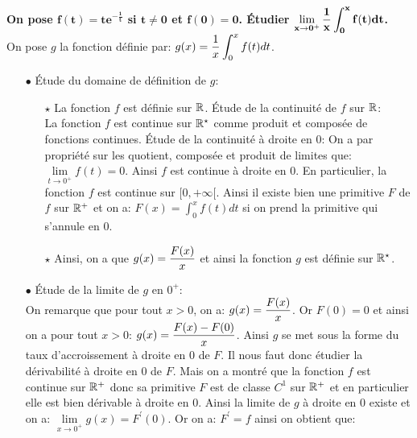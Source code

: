 \documentclass[a4paper, 11pt,reqno]{article}
\begin{document}
\vspace*{-0.5cm}
\begin{correction}\;
	\noindent \textbf{On pose $\mathbf{f(t)=te^{-\frac{1}{t}}}$ si $\mathbf{t\not= 0}$ et $\mathbf{f(0)=0}$. \'Etudier $\mathbf{\lim\limits_{x\to 0^+} \displaystyle\frac{1}{x}\int_0^x f(t)dt}$.}\\
	\noindent On pose $g$ la fonction d\'efinie par: $g(x)=\displaystyle\frac{1}{x}\int_0^x f(t)dt$.
	\begin{itemize}
		\item[$\bullet$] \'Etude du domaine de d\'efinition de $g$:\\
		      \begin{itemize}
			      \item[$\star$] La fonction $f$ est d\'efinie sur $\mathbb{R}$. \'Etude de la continuit\'e de $f$ sur $\mathbb{R}$:\\
			            \noindent  La fonction $f$ est continue sur $\mathbb{R}^{\star}$ comme produit et compos\'ee de fonctions continues. \'Etude de la continuit\'e \`{a} droite en 0: On a par propri\'et\'e sur les quotient, compos\'ee et produit de limites que: $\lim\limits_{t\to 0^+} f(t)=0$. Ainsi $f$ est continue \`{a} droite en 0. En particulier, la fonction $f$ est continue sur $\lbrack 0,+\infty\lbrack$.
			            Ainsi il existe bien une primitive $F$ de $f$ sur $\mathbb{R}^+$ et on a: $F(x)=\int_0^x f(t)dt$ si on prend la primitive qui s'annule en 0.
			      \item[$\star$] Ainsi, on a que $g(x)=\displaystyle\frac{F(x)}{x}$ et ainsi la fonction $g$ est d\'efinie sur $\mathbb{R}^{\star}$.
		      \end{itemize}
		\item[$\bullet$] \'Etude de la limite de $g$ en $0^+$:\\
		      \noindent On remarque que pour tout $x>0$, on a: $g(x)=\displaystyle\frac{F(x)}{x}$. Or $F(0)=0$ et ainsi on a pour tout $x>0$: $g(x)=\displaystyle\frac{F(x)-F(0)}{x}$. Ainsi $g$ se met sous la forme du taux d'accroissement \`{a} droite en 0 de $F$. Il nous faut donc \'etudier la d\'erivabilit\'e \`{a} droite en 0 de $F$. Mais on a montr\'e que la fonction $f$ est continue sur $\mathbb{R}^+$ donc sa primitive $F$ est de classe $C^1$ sur $\mathbb{R}^+$ et en particulier elle est bien d\'erivable \`{a} droite en 0. Ainsi la limite de $g$ \`{a} droite en 0 existe et on a: $\lim\limits_{x\to 0^+} g(x)=F^{\prime}(0)$. Or on a: $F^{\prime}=f$ ainsi on obtient que: 
	\end{itemize}
\end{correction}
\end{document}
